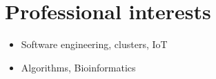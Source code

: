 \documentclass[10pt,a4paper,roman,final]{moderncv}
\begin{document}
\section{Professional interests}
\begin{itemize}
\item Software engineering, clusters, IoT
\item Algorithms, Bioinformatics
\end{itemize}

\clearpage

%
%
%
%
%
\end{document}
